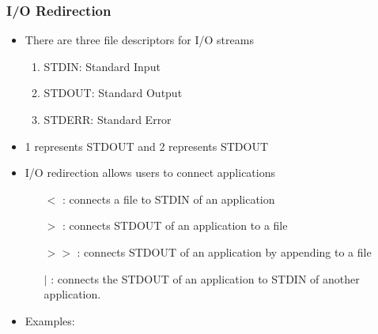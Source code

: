\documentclass[10pt,t]{beamer}
\begin{document}
\begin{frame}
  \frametitle{I/O Redirection}
  \begin{itemize}
    \item There are three file descriptors for I/O streams
    \begin{enumerate}
        \item STDIN: Standard Input
        \item STDOUT: Standard Output
        \item STDERR: Standard Error
    \end{enumerate}
    \item 1 represents STDOUT and 2 represents STDOUT
    \item I/O redirection allows users to connect applications
    \begin{itemize}
      \item[$<$]: connects a file to STDIN of an application
      \item[$>$]: connects STDOUT of an application to a file
      \item[$> >$]: connects STDOUT of an application by appending to a file
      \item[$|$]: connects the STDOUT of an application to STDIN of another application.
    \end{itemize}
    \item Examples:
  \end{itemize}
\end{frame}
\end{document}
